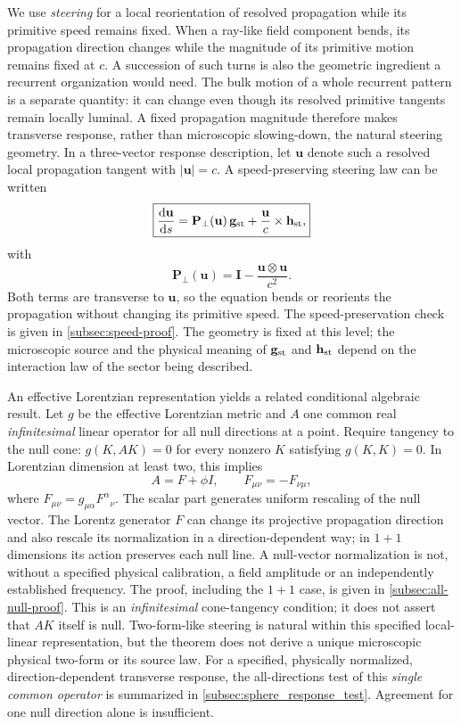 \documentclass[11pt]{article}
\theoremstyle{definition}
\newcommand{\dd}{\mathrm{d}}
\begin{document}
We use \emph{steering} for a local reorientation of resolved propagation while its
primitive speed remains fixed. When a ray-like field component bends, its propagation
direction changes while the magnitude of its primitive motion remains fixed at $c$.
A succession of such turns is also the geometric ingredient a recurrent organization
would need. The bulk motion of a whole recurrent pattern is a separate quantity: it can
change even though its resolved primitive tangents remain locally luminal.
A fixed propagation magnitude therefore makes transverse response, rather
than microscopic slowing-down, the natural steering geometry.  In a three-vector response description, let $\mathbf u$ denote such a
resolved local propagation tangent with $|\mathbf u|=c$.  A speed-preserving steering law
can be written
\begin{equation}
\boxed{
\frac{\dd\mathbf u}{\dd s}
=
\mathbf P_\perp(\mathbf u)\,\mathbf g_{\rm st}
+
\frac{\mathbf u}{c}\times\mathbf h_{\rm st},
}
\label{eq:projected_steering}
\end{equation}
with
\begin{equation}
\mathbf P_\perp(\mathbf u)=
\mathbf I-\frac{\mathbf u\otimes\mathbf u}{c^2}.
\end{equation}
Both terms are transverse to $\mathbf u$, so the equation bends or reorients the
propagation without changing its primitive speed.  The speed-preservation check is given in \cref{subsec:speed-proof}.
The geometry is fixed at this level;
the microscopic source and the physical meaning of $\mathbf g_{\rm st}$ and
$\mathbf h_{\rm st}$ depend on the interaction law of the sector being described.

An effective Lorentzian representation yields a related conditional algebraic result.
Let $g$ be the effective Lorentzian metric and $A$ one common real \emph{infinitesimal}
linear operator for all null directions at a point.  Require tangency to the null cone:
$g(K,AK)=0$ for every nonzero $K$ satisfying $g(K,K)=0$.  In Lorentzian
dimension at least two, this implies
\begin{equation}
\boxed{A=F+\phi I,\qquad F_{\mu\nu}=-F_{\nu\mu},}
\label{eq:all_null_A}
\end{equation}
where $F_{\mu\nu}=g_{\mu\alpha}F^\alpha{}_{\nu}$.  The scalar part generates
uniform rescaling of the null vector.  The Lorentz generator $F$ can change its
projective propagation direction and also rescale its normalization in a
direction-dependent way; in $1+1$ dimensions its action preserves each null
line.  A null-vector normalization is not, without a specified physical
calibration, a field amplitude or an independently established frequency.
The proof, including the $1+1$ case, is given in \cref{subsec:all-null-proof}.  This is an \emph{infinitesimal} cone-tangency condition;
it does not assert that $AK$ itself is null.  Two-form-like steering is natural within
this specified local-linear representation, but the theorem does not derive a unique
microscopic physical two-form or its source law.
For a specified, physically normalized, direction-dependent transverse response,
the all-directions test of this \emph{single common operator} is summarized
in \cref{subsec:sphere_response_test}.  Agreement for one null direction
alone is insufficient.
\end{document}
